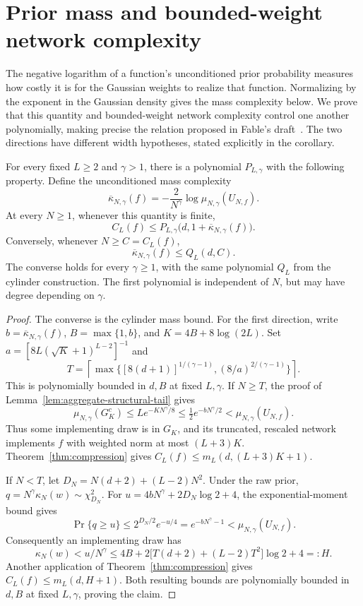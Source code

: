 \section{Prior mass and bounded-weight network complexity}\label{sec:mass-complexity}
The negative logarithm of a function's unconditioned prior probability
measures how costly it is for the Gaussian weights to realize that
function. Normalizing by the exponent in the Gaussian density gives the
mass complexity below. We prove that this quantity and bounded-weight
network complexity control one another polynomially, making precise the
relation proposed in Fable's draft~\cite{fable}. The two directions have
different width hypotheses, stated explicitly in the corollary.

\begin{corollary}
\label{cor:mass-complexity}
For every fixed $L\geq2$ and $\gamma>1$, there is a polynomial
$P_{L,\gamma}$ with the following property. Define the unconditioned mass
complexity
\[
 \overline\kappa_{N,\gamma}(f)
 =-\frac{2}{N^\gamma}\log\mu_{N,\gamma}(U_{N,f}).
\]
At every $N\geq1$, whenever this quantity is finite,
\[
 C_L(f)\leq
 P_{L,\gamma}\bigl(d,1+\overline\kappa_{N,\gamma}(f)\bigr).
\]
Conversely, whenever $N\geq C=C_L(f)$,
\[
 \overline\kappa_{N,\gamma}(f)\leq Q_L(d,C).
\]
The converse holds for every $\gamma\geq1$, with the same polynomial
$Q_L$ from the cylinder construction. The first polynomial is independent
of $N$, but may have degree depending on $\gamma$.
\end{corollary}
\begin{proof}
The converse is the cylinder mass bound. For the first direction, write
$b=\overline\kappa_{N,\gamma}(f)$, $B=\max\{1,b\}$, and
$K=4B+8\log(2L)$. Set $a=[8L(\sqrt K+1)^{L-2}]^{-1}$ and
\[
 T=\left\lceil\max\{[8(d+1)]^{1/(\gamma-1)},
                         (8/a)^{2/(\gamma-1)}\}\right\rceil.
\]
This is polynomially bounded in $d,B$ at fixed $L,\gamma$.
If $N\geq T$, the proof of Lemma~\ref{lem:aggregate-structural-tail} gives
\[
 \mu_{N,\gamma}(G_K^c)
 \leq Le^{-KN^\gamma/8}
 \leq\tfrac12e^{-bN^\gamma/2}
 <\mu_{N,\gamma}(U_{N,f}).
\]
Thus some implementing draw is in $G_K$, and its truncated, rescaled
network implements $f$ with weighted norm at most $(L+3)K$.
Theorem~\ref{thm:compression} gives $C_L(f)\leq m_L(d,(L+3)K+1)$.

If $N<T$, let $D_N=N(d+2)+(L-2)N^2$.
Under the raw prior, $q=N^\gamma\kappa_N(w)\sim\chi^2_{D_N}$.
For $u=4bN^\gamma+2D_N\log2+4$, the exponential-moment bound gives
\[
 \Pr\{q\geq u\}\leq2^{D_N/2}e^{-u/4}
 =e^{-bN^\gamma-1}<\mu_{N,\gamma}(U_{N,f}).
\]
Consequently an implementing draw has
\[
 \kappa_N(w)<u/N^\gamma
 \leq4B+2\bigl[T(d+2)+(L-2)T^2\bigr]\log2+4=:H.
\]
Another application of Theorem~\ref{thm:compression} gives $C_L(f)\leq m_L(d,H+1)$.
Both resulting bounds are polynomially bounded in $d,B$ at fixed
$L,\gamma$, proving the claim.
\end{proof}
